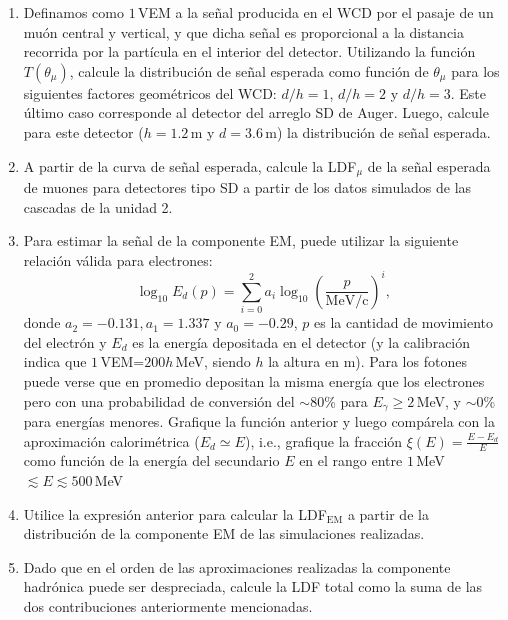 \documentclass[11pt]{article}
\begin{document}
\begin{enumerate}
		\begin{enumerate}
			\item Definamos como $1$\,VEM a la señal producida en el WCD por el
				pasaje de un muón central y vertical, y que dicha señal es
				proporcional a la distancia recorrida por la partícula en el
				interior del detector. Utilizando la función $T(\theta_\mu)$,
				calcule la distribución de señal esperada como función de
				$\theta_\mu$ para los siguientes factores geométricos del WCD:
				$d/h=1$, $d/h=2$ y $d/h=3$. Este último caso corresponde al
				detector del arreglo SD de Auger. Luego, calcule para este
				detector ($h=1.2$\,m y $d=3.6$\,m) la distribución de señal
				esperada.
			\item A partir de la curva de señal esperada, calcule la LDF$_\mu$
				de la señal esperada de muones para detectores tipo SD a partir
				de los datos simulados de las cascadas de la unidad 2.
			\item Para estimar la señal de la componente EM, puede utilizar la
				siguiente relación válida para electrones:
				$$\log_{10} E_d(p) = \sum_{i=0}^2 a_i \log_{10}
				\left(\frac{p}{\mathrm{MeV/c}} \right)^i,$$
				donde $a_2=-0.131, a_1=1.337$ y $a_0=-0.29$, $p$ es la cantidad
				de movimiento del electrón y $E_d$ es la energía depositada en
				el detector (y la calibración indica que $1$\,VEM=$200 h$\,MeV,
				siendo $h$ la altura en m). Para los fotones puede verse que
				en promedio depositan la misma energía que los electrones pero
				con una probabilidad de conversión del $\sim 80$\% para $E_\gamma
				\geq 2$\,MeV, y $\sim 0\%$ para energías menores. Grafique la
				función anterior y luego compárela con la aproximación calorimétrica
				($E_d \simeq E$), i.e., grafique la fracción $\xi(E) =
				\frac{E-E_d}{E}$ como función de la energía del secundario $E$
				en el rango entre $1$\,MeV$\lesssim E \lesssim 500$\,MeV
			\item Utilice la expresión anterior para calcular la
				LDF$_{\mathrm{EM}}$ a partir de la distribución de la
				componente EM de las simulaciones realizadas.
			\item Dado que en el orden de las aproximaciones realizadas la
				componente hadrónica puede ser despreciada, calcule la LDF
				total como la suma de las dos contribuciones anteriormente
				mencionadas.
		\end{enumerate}
\end{enumerate}
\end{document}
